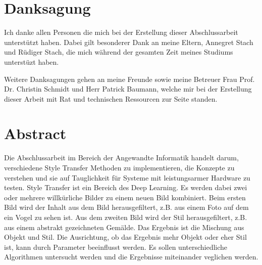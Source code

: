\chapter*{Danksagung}

Ich danke allen Personen die mich bei der Erstellung dieser Abschlussarbeit unterstützt haben. Dabei gilt besonderer Dank an meine Eltern, Annegret Stach und Rüdiger Stach, die mich während der gesamten Zeit meines Studiums unterstüzt haben.

Weitere Danksagungen gehen an meine Freunde sowie meine Betreuer Frau Prof. Dr. Christin Schmidt und Herr Patrick Baumann, welche mir bei der Erstellung dieser Arbeit mit Rat und technischen Ressourcen zur Seite standen.

\pagebreak

\chapter*{Abstract}


Die Abschlussarbeit im Bereich der Angewandte Informatik handelt darum, verschiedene Style Transfer Methoden zu implementieren, die Konzepte zu verstehen und sie auf Tauglichkeit für Systeme mit leistungsarmer Hardware zu testen. Style Transfer ist ein Bereich des Deep Learning. Es werden dabei zwei oder mehrere willkürliche Bilder zu einem neuen Bild kombiniert. Beim ersten Bild wird der Inhalt aus dem Bild herausgefiltert, z.B. aus einem Foto auf dem ein Vogel zu sehen ist. Aus dem zweiten Bild wird der Stil herausgefiltert, z.B. aus einem abstrakt gezeichneten Gemälde. Das Ergebnis ist die Mischung aus Objekt und Stil. Die Ausrichtung, ob das Ergebnis mehr Objekt oder eher Stil ist, kann durch Parameter beeinflusst werden. Es sollen unterschiedliche Algorithmen untersucht werden und die Ergebnisse miteinander veglichen werden.